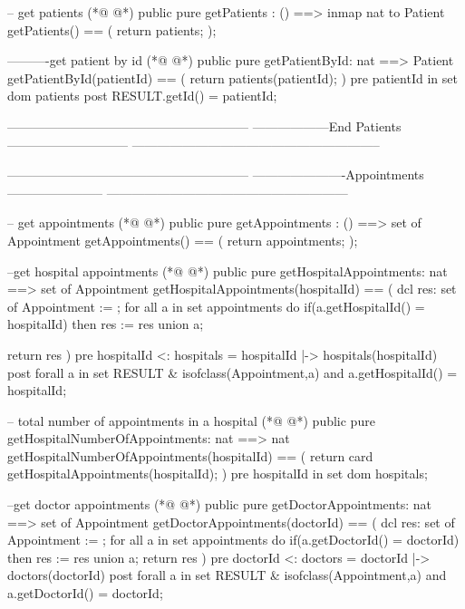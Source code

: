 \begin{vdmpp}[breaklines=true]
   -- get patients
(*@
\label{getPatients:266}
@*)
  public pure getPatients : () ==> inmap nat to Patient
  getPatients() == (
   return patients;
  );
  
  ----------get patient by id
(*@
\label{getPatientById:272}
@*)
  public pure getPatientById: nat ==> Patient
   getPatientById(patientId) == (
    return patients(patientId);
   )
  pre patientId in set dom patients
  post RESULT.getId() = patientId;
  
  
  ---------------------------------------------------------
  ------------------End Patients-----------------------------
  -----------------------------------------------------------

  ---------------------------------------------------------
  ----------------------Appointments-----------------------
  ---------------------------------------------------------
  
  -- get appointments
(*@
\label{getAppointments:289}
@*)
  public pure getAppointments : () ==> set of Appointment
  getAppointments() == (
   return appointments;
  );
  
  --get hospital appointments
(*@
\label{getHospitalAppointments:295}
@*)
  public pure getHospitalAppointments: nat ==> set of Appointment
  getHospitalAppointments(hospitalId) == (
   dcl res: set of Appointment := {};
   for all a in set appointments do 
    if(a.getHospitalId() = hospitalId) then
      res := res union {a}; 
  
   return res
  )
  pre {hospitalId} <: hospitals = { hospitalId |-> hospitals(hospitalId) }
  post forall a in set RESULT & isofclass(Appointment,a) and a.getHospitalId() = hospitalId;

  -- total number of appointments in a hospital
(*@
\label{getHospitalNumberOfAppointments:308}
@*)
  public pure getHospitalNumberOfAppointments: nat ==> nat
   getHospitalNumberOfAppointments(hospitalId) == (
    return card getHospitalAppointments(hospitalId);
  )
  pre hospitalId in set dom hospitals;
   
  
  
  --get doctor appointments
(*@
\label{getDoctorAppointments:317}
@*)
  public pure getDoctorAppointments: nat ==> set of Appointment
  getDoctorAppointments(doctorId) == (
   dcl res: set of Appointment := {};
   for all a in set appointments do 
    if(a.getDoctorId() = doctorId) then
      res := res union {a}; 
   return res
  )
  pre {doctorId} <: doctors = { doctorId |-> doctors(doctorId) }
  post forall a in set RESULT & isofclass(Appointment,a) and a.getDoctorId() = doctorId;
  

\end{vdmpp}
